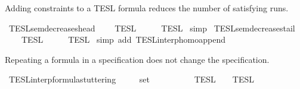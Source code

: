 \begin{isabellebody}
{\isafolddocument}%
%
\isadelimdocument
%
\endisadelimdocument
%
\begin{isamarkuptext}%
Adding constraints to a TESL formula reduces the number of satisfying runs.%
\end{isamarkuptext}\isamarkuptrue%
\isamarkupfalse%
\ TESL{\isacharunderscore}sem{\isacharunderscore}decreases{\isacharunderscore}head{\isacharcolon}\isanewline
\ \ {\isacartoucheopen}{\isasymlbrakk}{\isasymlbrakk}\ {\isasymPhi}\ {\isasymrbrakk}{\isasymrbrakk}\isactrlsub T\isactrlsub E\isactrlsub S\isactrlsub L\ {\isasymsupseteq}\ {\isasymlbrakk}{\isasymlbrakk}\ {\isasymphi}\ {\isacharhash}\ {\isasymPhi}\ {\isasymrbrakk}{\isasymrbrakk}\isactrlsub T\isactrlsub E\isactrlsub S\isactrlsub L{\isacartoucheclose}\isanewline
%
\isadelimproof
%
\endisadelimproof
%
\isatagproof
{}\isamarkupfalse%
\ simp%
\endisatagproof
{\isafoldproof}%
%
\isadelimproof
\isanewline
%
\endisadelimproof
\isanewline
{}\isamarkupfalse%
\ TESL{\isacharunderscore}sem{\isacharunderscore}decreases{\isacharunderscore}tail{\isacharcolon}\isanewline
\ \ {\isacartoucheopen}{\isasymlbrakk}{\isasymlbrakk}\ {\isasymPhi}\ {\isasymrbrakk}{\isasymrbrakk}\isactrlsub T\isactrlsub E\isactrlsub S\isactrlsub L\ {\isasymsupseteq}\ {\isasymlbrakk}{\isasymlbrakk}\ {\isasymPhi}\ {\isacharat}\ {\isacharbrackleft}{\isasymphi}{\isacharbrackright}\ {\isasymrbrakk}{\isasymrbrakk}\isactrlsub T\isactrlsub E\isactrlsub S\isactrlsub L{\isacartoucheclose}\isanewline
%
\isadelimproof
%
\endisadelimproof
%
\isatagproof
{}\isamarkupfalse%
\ {\isacharparenleft}simp\ add{\isacharcolon}\ TESL{\isacharunderscore}interp{\isacharunderscore}homo{\isacharunderscore}append{\isacharparenright}%
\endisatagproof
{\isafoldproof}%
%
\isadelimproof
%
\endisadelimproof
%
\begin{isamarkuptext}%
Repeating a formula in a specification does not change the specification.%
\end{isamarkuptext}\isamarkuptrue%
\isamarkupfalse%
\ TESL{\isacharunderscore}interp{\isacharunderscore}formula{\isacharunderscore}stuttering{\isacharcolon}\isanewline
\ \ \ {\isacartoucheopen}{\isasymphi}\ {\isasymin}\ set\ {\isasymPhi}{\isacartoucheclose}\isanewline
\ \ \ \ \ {\isacartoucheopen}{\isasymlbrakk}{\isasymlbrakk}\ {\isasymphi}\ {\isacharhash}\ {\isasymPhi}\ {\isasymrbrakk}{\isasymrbrakk}\isactrlsub T\isactrlsub E\isactrlsub S\isactrlsub L\ {\isacharequal}\ {\isasymlbrakk}{\isasymlbrakk}\ {\isasymPhi}\ {\isasymrbrakk}{\isasymrbrakk}\isactrlsub T\isactrlsub E\isactrlsub S\isactrlsub L{\isacartoucheclose}\isanewline

\end{isabellebody}
